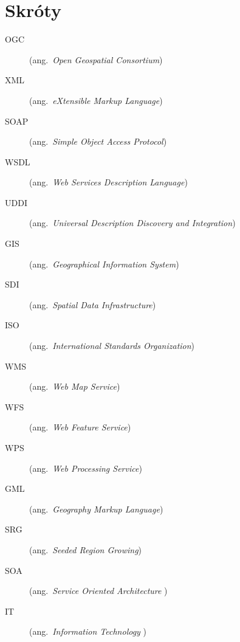 \chapter*{Skróty}\mbox{}
\label{sec:skroty}
\noindent
\begin{description}
  \item [OGC] (ang.\ \emph{Open Geospatial Consortium}) %
  \item [XML] (ang.\ \emph{eXtensible Markup Language})
  \item [SOAP] (ang.\ \emph{Simple Object Access Protocol})
  \item [WSDL] (ang.\ \emph{Web Services Description Language})
  \item [UDDI] (ang.\ \emph{Universal Description Discovery and Integration})
  \item [GIS] (ang.\ \emph{Geographical Information System})
  \item [SDI] (ang.\ \emph{Spatial Data Infrastructure})
  \item [ISO] (ang.\ \emph{International Standards Organization})
  \item [WMS] (ang.\ \emph{Web Map Service})
  \item [WFS] (ang.\ \emph{Web Feature Service})
  \item [WPS] (ang.\ \emph{Web Processing Service})
  \item [GML] (ang.\ \emph{Geography Markup Language})
  \item [SRG] (ang.\ \emph{Seeded Region Growing})
  \item [SOA] (ang.\ \emph{Service Oriented Architecture })
  \item [IT] (ang.\ \emph{Information Technology })
\end{description}
